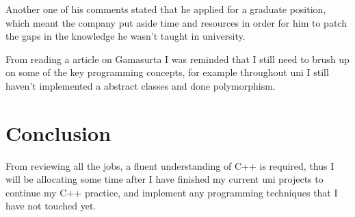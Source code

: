 \documentclass{scrartcl}
\begin{document}
Another one of his comments stated that he applied for a graduate position, which meant the company put aside time and resources in order for him to patch the gaps in the knowledge he wasn't taught in university.


From reading a article on Gamasurta \cite{programmerAdvice} I was reminded that I still need to brush up on some of the key programming concepts, for example throughout uni I still haven't implemented a abstract classes and done polymorphism.


\section{Conclusion}

From reviewing all the jobs, a fluent understanding of C++ is required, thus I will be allocating some time after I have finished my current uni projects to continue my C++ practice, and implement any programming techniques that I have not touched yet.
\end{document}
